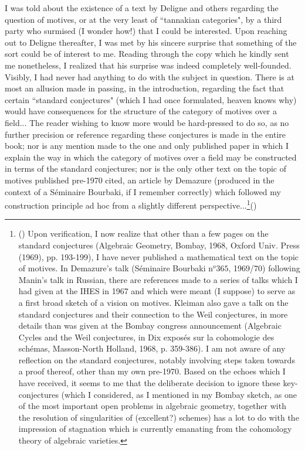 I was told about the existence of a text by Deligne and others regarding the question of motives, or at the very least of ``tannakian categories", by a third party who surmised (I wonder how!) that I could be interested. Upon reaching out to Deligne thereafter, I was met by his sincere surprise that something of the sort could be of interest to me. Reading through the copy which he kindly sent me nonetheless, I realized that his surprise was indeed completely well-founded. Visibly, I had never had anything to do with the subject in question. There is at most an allusion made in passing, in the introduction, regarding the fact that certain ``standard conjectures" (which I had once formulated, heaven knows why) would have consequences for the structure of the category of motives over a field... The reader wishing to know more would be hard-pressed to do so, as no further precision or reference regarding these conjectures is made in the entire book; nor is any mention made to the one and only published paper in which I explain the way in which the category of motives over a field may be constructed in terms of the standard conjectures; nor is the only other text on the topic of motives published pre-1970 cited, an article by Demazure (produced in the context of a S\'eminaire Bourbaki, if I remember correctly) which followed my construction principle ad hoc from a slightly different perspective...\footnote{() Upon verification, I now realize that other than a few pages on the standard conjectures (Algebraic Geometry, Bombay, 1968, Oxford Univ. Press (1969), pp. 193-199), I have never published a mathematical text on the topic of motives. In Demazure's talk (S\'eminaire Bourbaki n$^o 365$, 1969/70) following Manin's talk in Russian, there are references made to a series of talks which I had given at the IHES in 1967 and which were meant (I suppose) to serve as a first broad sketch of a vision on motives. Kleiman also gave a talk on the standard conjectures and their connection to the Weil conjectures, in more details than was given at the Bombay congress announcement (Algebraic Cycles and the Weil conjectures, in Dix expos\'es sur la cohomologie des sch\'emas, Masson-North Holland, 1968, p. 359-386). I am not aware of any reflection on the standard conjectures, notably involving steps taken towards a proof thereof, other than my own pre-1970. Based on the echoes which I have received, it seems to me that the deliberate decision to ignore these key-conjectures (which I considered, as I mentioned in my Bombay sketch, as one of the most important open problems in algebraic geometry, together with the resolution of singularities of (excellent?) schemes) has a lot to do with the impression of stagnation which is currently emanating from the cohomology theory of algebraic varieties.}()

